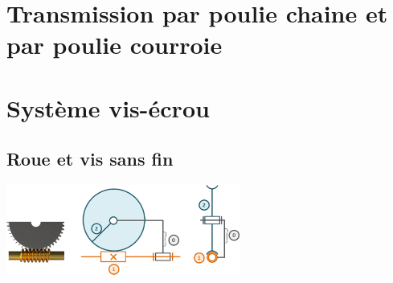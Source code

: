 \section*{Transmission par poulie chaine et par poulie courroie}

\section*{Système vis-écrou}

\subsection*{Roue et vis sans fin}

\begin{center}
\includegraphics[height=3cm]{images/fig_04.png}
\end{center}

